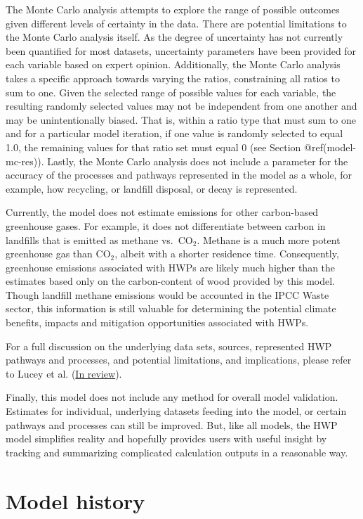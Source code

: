 \documentclass[
  openany]{book}
\begin{document}
The Monte Carlo analysis attempts to explore the range of possible
outcomes given different levels of certainty in the data. There are
potential limitations to the Monte Carlo analysis itself. As the degree
of uncertainty has not currently been quantified for most datasets,
uncertainty parameters have been provided for each variable based on
expert opinion. Additionally, the Monte Carlo analysis takes a specific
approach towards varying the ratios, constraining all ratios to sum to
one. Given the selected range of possible values for each variable, the
resulting randomly selected values may not be independent from one
another and may be unintentionally biased. That is, within a ratio type
that must sum to one and for a particular model iteration, if one value
is randomly selected to equal 1.0, the remaining values for that ratio
set must equal 0 (see Section @ref(model-mc-res)). Lastly, the Monte
Carlo analysis does not include a parameter for the accuracy of the
processes and pathways represented in the model as a whole, for example,
how recycling, or landfill disposal, or decay is represented.

Currently, the model does not estimate emissions for other carbon-based
greenhouse gases. For example, it does not differentiate between carbon
in landfills that is emitted as methane vs.~CO\(_2\). Methane is a much
more potent greenhouse gas than CO\(_2\), albeit with a shorter
residence time. Consequently, greenhouse emissions associated with HWPs
are likely much higher than the estimates based only on the
carbon-content of wood provided by this model. Though landfill methane
emissions would be accounted in the IPCC Waste sector, this information
is still valuable for determining the potential climate benefits,
impacts and mitigation opportunities associated with HWPs.

For a full discussion on the underlying data sets, sources, represented
HWP pathways and processes, and potential limitations, and implications,
please refer to Lucey et al. (\protect\hyperlink{ref-lucey202X}{In
review}).

Finally, this model does not include any method for overall model
validation. Estimates for individual, underlying datasets feeding into
the model, or certain pathways and processes can still be improved. But,
like all models, the HWP model simplifies reality and hopefully provides
users with useful insight by tracking and summarizing complicated
calculation outputs in a reasonable way.

\hypertarget{int-hist}{%
\section{Model history}\label{int-hist}}
\end{document}
